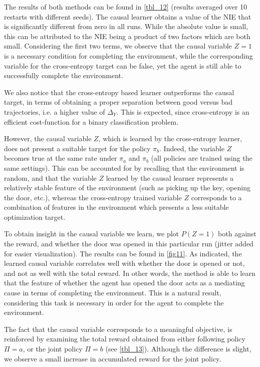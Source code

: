 \documentclass[letterpaper]{article} %
\newcommand{\EE}{\mathbb{E}}
\newcommand{\NIE}{\textrm{NIE}\xspace}
\begin{document}
	The results of both methods can be found in \cref{tbl_12} (results averaged over 10 restarts with different seeds). The causal learner obtains a value of the \NIE that is significantly different from zero in all runs. While the absolute value is small, this can be attributed to the \NIE being a product of two factors which are both small. Considering the first two terms, we observe that the causal variable $Z=1$ is a necessary condition for completing the environment, while the corresponding variable for the cross-entropy target can be false, yet the agent is still able to successfully complete the environment. 
	
	We also notice that the cross-entropy based learner outperforms the causal target, in terms of obtaining a proper separation between good versus bad trajectories, i.e. a higher value of $\Delta_Y$. %
	This is expected, since cross-entropy is an efficient cost-function for a binary classification problem. 
	
	However, the causal variable $Z$, which is learned by the cross-entropy learner, does not present a suitable target for the policy $\pi_b$. Indeed, the variable $Z$ becomes true at the same rate under $\pi_a$ and $\pi_b$ (all policies are trained using the same settings). This can be accounted for by recalling that the environment is random, and that the variable $Z$ learned by the causal learner represents a relatively stable feature of the environment (such as picking up the key, opening the door, etc.), whereas the cross-entropy trained variable $Z$ corresponds to a combination of features in the environment which presents a less suitable optimization target. 
	
	
	
	To obtain insight in the causal variable we learn, we plot $P(Z=1)$ both against the reward, and whether the door was opened in this particular run (jitter added for easier visualization). The results can be found in \cref{fig11}. As indicated, the learned causal variable correlates well with whether the door is opened or not, and not as well with the total reward. In other words, the method is able to learn that the feature of whether the agent has opened the door acts as a mediating cause in terms of completing the environment. This is a natural result, considering this task is necessary in order for the agent to complete the environment.
	
	
	
	The fact that the causal variable corresponds to a meaningful objective, is reinforced by examining the total reward obtained from either following policy $\Pi =a$, or the joint policy $\Pi=b$ (see \cref{tbl_13}). Although the difference is slight, we observe a small increase in accumulated reward for the joint policy. 
	
\end{document}
